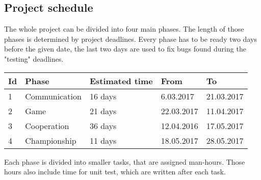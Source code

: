 \documentclass[11pt,a4paper]{article}
\begin{document}
\subsection{Project schedule}

The whole project can be divided into four main phases. The length of those phases is determined by project deadlines. Every phase has to be ready two days before the given date, the last two days are used to fix bugs found during the "testing" deadlines. \\

\begin{longtable}{| p{1cm} | p{4cm} | p{3cm} | l | l |}
\hline
\textbf{Id} & \textbf{Phase} & \textbf{Estimated time} & \textbf{From} & \textbf{To} \\ \hline
1 & Communication & 16 days & 6.03.2017 & 21.03.2017 \\ \hline
2 & Game & 21 days & 22.03.2017 & 11.04.2017 \\ \hline
3 & Cooperation & 36 days & 12.04.2016 & 17.05.2017 \\ \hline
4 & Championship & 11 days & 18.05.2017 & 28.05.2017 \\ \hline
\end{longtable}

Each phase is divided into smaller tasks, that are assigned man-hours. Those hours also include time for unit test, which are written after each task.
\end{document}
